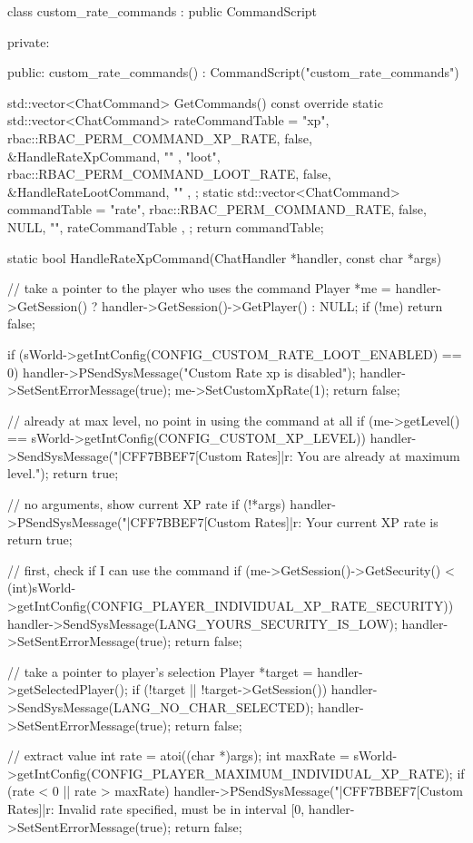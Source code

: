 class custom_rate_commands : public CommandScript
{
private:

public:
	custom_rate_commands() : CommandScript("custom_rate_commands") {}

    std::vector<ChatCommand> GetCommands() const override
	{
		static std::vector<ChatCommand> rateCommandTable =
		{
			{ "xp",   rbac::RBAC_PERM_COMMAND_XP_RATE,   false, &HandleRateXpCommand,   "" },
			{ "loot", rbac::RBAC_PERM_COMMAND_LOOT_RATE, false, &HandleRateLootCommand, "" },
		};
		static std::vector<ChatCommand> commandTable =
		{
			{ "rate", rbac::RBAC_PERM_COMMAND_RATE,      false, NULL, "", rateCommandTable },
		};
		return commandTable;
	}

	static bool HandleRateXpCommand(ChatHandler *handler, const char *args)
	{
		// take a pointer to the player who uses the command
		Player *me = handler->GetSession() ? handler->GetSession()->GetPlayer() : NULL;
		if (!me)
			return false;

		if (sWorld->getIntConfig(CONFIG_CUSTOM_RATE_LOOT_ENABLED) == 0)
		{
			handler->PSendSysMessage("Custom Rate xp is disabled");
			handler->SetSentErrorMessage(true);
			me->SetCustomXpRate(1);
			return false;
		}

		// already at max level, no point in using the command at all
		if (me->getLevel() == sWorld->getIntConfig(CONFIG_CUSTOM_XP_LEVEL))
		{
			handler->SendSysMessage("|CFF7BBEF7[Custom Rates]|r: You are already at maximum level.");
			return true;
		}

		// no arguments, show current XP rate
		if (!*args)
		{
			handler->PSendSysMessage("|CFF7BBEF7[Custom Rates]|r: Your current XP rate is %
			return true;
		}

		// first, check if I can use the command
		if (me->GetSession()->GetSecurity() < (int)sWorld->getIntConfig(CONFIG_PLAYER_INDIVIDUAL_XP_RATE_SECURITY))
		{
			handler->SendSysMessage(LANG_YOURS_SECURITY_IS_LOW);
			handler->SetSentErrorMessage(true);
			return false;
		}

		// take a pointer to player's selection
		Player *target = handler->getSelectedPlayer();
		if (!target || !target->GetSession())
		{
			handler->SendSysMessage(LANG_NO_CHAR_SELECTED);
			handler->SetSentErrorMessage(true);
			return false;
		}

		// extract value
		int rate = atoi((char *)args);
		int maxRate = sWorld->getIntConfig(CONFIG_PLAYER_MAXIMUM_INDIVIDUAL_XP_RATE);
		if (rate < 0 || rate > maxRate)
		{
			handler->PSendSysMessage("|CFF7BBEF7[Custom Rates]|r: Invalid rate specified, must be in interval [0,%
			handler->SetSentErrorMessage(true);
			return false;
		}

}}
